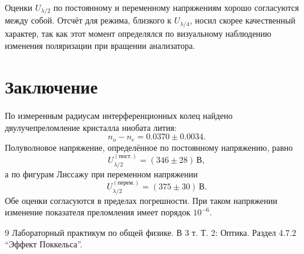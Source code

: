 \documentclass[a4paper,12pt]{article}
\begin{document}
Оценки $U_{\lambda/2}$ по постоянному и переменному напряжениям хорошо согласуются между собой. Отсчёт для режима, близкого к $U_{\lambda/4}$, носил скорее качественный характер, так как этот момент определялся по визуальному наблюдению изменения поляризации при вращении анализатора.

\section*{Заключение}
По измеренным радиусам интерференционных колец найдено двулучепреломление кристалла ниобата лития:
\[
n_o-n_e = 0.0370 \pm 0.0034.
\]
Полуволновое напряжение, определённое по постоянному напряжению, равно
\[
U_{\lambda/2}^{(\text{пост.})}=(346\pm28)\,\text{В},
\]
а по фигурам Лиссажу при переменном напряжении
\[
U_{\lambda/2}^{(\text{перем.})}=(375\pm30)\,\text{В}.
\]
Обе оценки согласуются в пределах погрешности. При таком напряжении изменение показателя преломления имеет порядок $10^{-6}$.

\begin{thebibliography}{9}
Лабораторный практикум по общей физике. В 3 т. Т. 2: Оптика. Раздел 4.7.2 ``Эффект Поккельса''.
\end{thebibliography}
\end{document}
